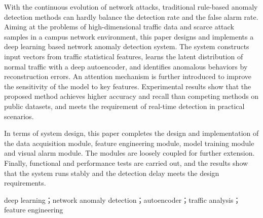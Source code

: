 
With the continuous evolution of network attacks, traditional rule-based anomaly detection methods can hardly balance the detection rate and the false alarm rate. Aiming at the problems of high-dimensional traffic data and scarce attack samples in a campus network environment, this paper designs and implements a deep learning based network anomaly detection system. The system constructs input vectors from traffic statistical features, learns the latent distribution of normal traffic with a deep autoencoder, and identifies anomalous behaviors by reconstruction errors. An attention mechanism is further introduced to improve the sensitivity of the model to key features. Experimental results show that the proposed method achieves higher accuracy and recall than competing methods on public datasets, and meets the requirement of real-time detection in practical scenarios.

In terms of system design, this paper completes the design and implementation of the data acquisition module, feature engineering module, model training module and visual alarm module. The modules are loosely coupled for further extension. Finally, functional and performance tests are carried out, and the results show that the system runs stably and the detection delay meets the design requirements.

\vspace{0.5em}
deep learning；network anomaly detection；autoencoder；traffic analysis；feature engineering

